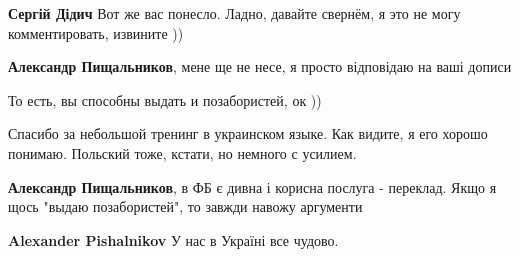 \begin{itemize}
\begin{itemize}
 
\textbf{Сергій Дідич} Вот же вас понесло. Ладно, давайте свернём, я это не могу комментировать, извините ))

 
\textbf{Александр Пищальников}, мене ще не несе, я просто відповідаю на ваші дописи

 

То есть, вы способны выдать и позабористей, ок ))

Спасибо за небольшой тренинг в украинском языке. Как видите, я его хорошо
понимаю. Польский тоже, кстати, но немного с усилием.

 
\textbf{Александр Пищальников}, в ФБ є дивна і корисна послуга - переклад. Якщо я щось "выдаю позабористей", то завжди навожу аргументи

 
\textbf{Alexander Pishalnikov} У нас в Україні все чудово.

 

\end{itemize}
\end{itemize}
